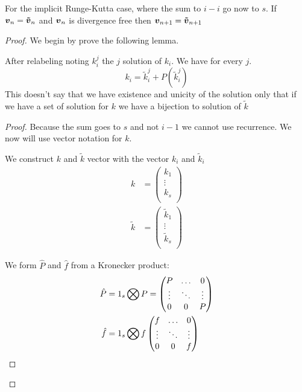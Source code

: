 \begin{thm}
For the implicit Runge-Kutta case, where the sum to $i-i$ go now to $s$.
If ${\boldsymbol {v}}_{n}={\boldsymbol {\tilde{v}}}_{n}$ and ${\boldsymbol {v}}_n$ is divergence free then ${\boldsymbol {v}}_{n+1}={\boldsymbol {\tilde{v}}}_{n+1}$ 
\end{thm}
\begin{proof}
We begin by prove the following lemma.
\begin{lem}
After relabeling noting $k_{i}^{j}$ the $j$ solution of $k_{i}$.
We have for every $j$.
\begin{equation}
  k_{i}=\tilde{k}_{i}^{j}+P(\tilde{k}_{i}^{j})
\end{equation}
This doesn't say that we have existence and unicity of the solution only that if we have a set of solution for $k$ we have a bijection
to solution of $\tilde{k}$
\end{lem}
\begin{proof}
Because the sum goes to $s$ and not $i-1$ we cannot use recurrence.
We now will use vector notation for $k$.

We construct $k$ and $\tilde{k}$ vector with the vector $k_{i}$ and $\tilde{k}_{i}$
\begin{align}
k&=\begin{pmatrix}
    k_{1}\\
    \vdots\\
    k_{s}\\
  \end{pmatrix}\\
\tilde{k}&=\begin{pmatrix}
    \tilde{k}_{1}\\
    \vdots\\
    \tilde{k}_{s}\\
  \end{pmatrix}
\end{align}

We form $\hat{P}$ and $\hat{f}$ from a Kronecker product:
\begin{align}
\hat{P}&=1_{s}\bigotimes P=\begin{pmatrix}P	&\ldots	&0\\
			\vdots &\ddots 	&\vdots\\
			0	&0	&P\\
	\end{pmatrix}\\
\hat{f}&=1_{s}\bigotimes f\begin{pmatrix}f	&\ldots	&0\\
			\vdots &\ddots 	&\vdots\\
			0	&0	&f\\
	\end{pmatrix}
\end{align}


\end{proof}
\end{proof}
